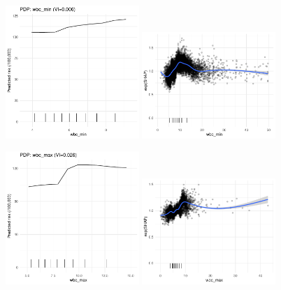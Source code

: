 \documentclass[12pt]{article}
\begin{document}
\begin{figure}[h]
\centering
\includegraphics[width=0.45\textwidth]{figures/pdp_new/wbc_min.pdf}
\includegraphics[width=0.45\textwidth]{figures/shap_new/wbc_min.pdf}
\end{figure}
\begin{figure}[h]
\centering
\includegraphics[width=0.45\textwidth]{figures/pdp_new/wbc_max.pdf}
\includegraphics[width=0.45\textwidth]{figures/shap_new/wbc_max.pdf}
\end{figure}
\end{document}
